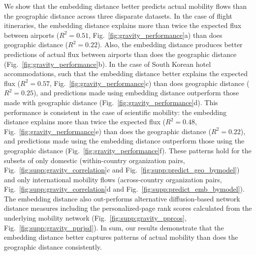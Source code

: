 \documentclass[12pt]{article} %
\begin{document}
We show that the embedding distance better predicts actual mobility flows than the geographic distance across three disparate datasets.
In the case of flight itineraries, the embedding distance explains more than twice the expected flux between airports ($R^{2} = 0.51$, Fig.~\ref{fig:gravity_performance}a) than does geographic distance ($R^{2} = 0.22$).  Also, the embedding distance produces better predictions of actual flux between airports than does the geographic distance (Fig.~\ref{fig:gravity_performance}b).
In the case of South Korean hotel accommodations, such that the embedding distance better explains the expected flux ($R^{2} = 0.57$, Fig.~\ref{fig:gravity_performance}c) than does geographic distance ($R^{2} = 0.25$), and predictions made using embedding distance outperform those made with geographic distance (Fig.~\ref{fig:gravity_performance}d). 
This performance is consistent in the case of scientific mobility:
the embedding distance explains more than twice the expected flux ($R^{2} = 0.48$, Fig.~\ref{fig:gravity_performance}e) than does the geographic distance ($R^{2} = 0.22$), and predictions made using the embedding distance outperform those using the geographic distance (Fig.~\ref{fig:gravity_performance}f).
These patterns hold for the subsets of only domestic (within-country organization pairs, Fig.~\ref{fig:supp:gravity_correlation}c and Fig.~\ref{fig:supp:predict_geo_bymodel}) and only international mobility flows (across-country organization pairs, Fig.~\ref{fig:supp:gravity_correlation}d and  Fig.~\ref{fig:supp:predict_emb_bymodel}).
The embedding distance also out-performs alternative diffusion-based network distance measures including the personalized-page rank scores  calculated from the underlying mobility network (Fig.~\ref{fig:supp:gravity_pprcos}, Fig.~\ref{fig:supp:gravity_pprjsd}).
In sum, our results demonstrate that the embedding distance better captures patterns of actual mobility than does the geographic distance consistently.
\end{document}
